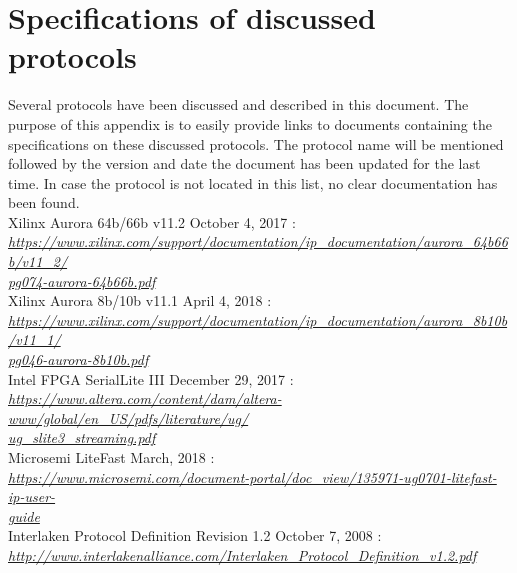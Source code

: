 \section{Specifications of discussed protocols}
\label{Appendix:Protocol_links}
Several protocols have been discussed and described in this document. The purpose of this appendix is to easily provide links to documents containing the specifications on these discussed protocols. The protocol name will be mentioned followed by the version and date the document has been updated for the last time. In case the protocol is not located in this list, no clear documentation has been found.\\ \newline
Xilinx Aurora 64b/66b v11.2 October 4, 2017 : \\
\href{https://www.xilinx.com/support/documentation/ip_documentation/aurora_64b66b/v11_2/pg074-aurora-64b66b.pdf}{\textit{https://www.xilinx.com/support/documentation/ip\_documentation/aurora\_64b66b/v11\_2/\\pg074-aurora-64b66b.pdf}}\\ \newline
Xilinx Aurora 8b/10b v11.1 April 4, 2018 : \\
\href{https://www.xilinx.com/support/documentation/ip_documentation/aurora_8b10b/v11_1/pg046-aurora-8b10b.pdf}{\textit{https://www.xilinx.com/support/documentation/ip\_documentation/aurora\_8b10b/v11\_1/\\pg046-aurora-8b10b.pdf}}\\
\newline
Intel FPGA SerialLite III December 29, 2017 : \\
\href{https://www.altera.com/content/dam/altera-www/global/en_US/pdfs/literature/ug/ug_slite3_streaming.pdf}{\textit{https://www.altera.com/content/dam/altera-www/global/en\_US/pdfs/literature/ug/\\ug\_slite3\_streaming.pdf}}\\
\newline
Microsemi LiteFast March, 2018 : \\
\href{https://www.microsemi.com/document-portal/doc_view/135971-ug0701-litefast-ip-user-guide}{\textit{https://www.microsemi.com/document-portal/doc\_view/135971-ug0701-litefast-ip-user-\\guide}}\\
\newline
Interlaken Protocol Definition Revision 1.2 October 7, 2008 : \\
\href{http://www.interlakenalliance.com/Interlaken_Protocol_Definition_v1.2.pdf}{\textit{http://www.interlakenalliance.com/Interlaken\_Protocol\_Definition\_v1.2.pdf}}\\ 
